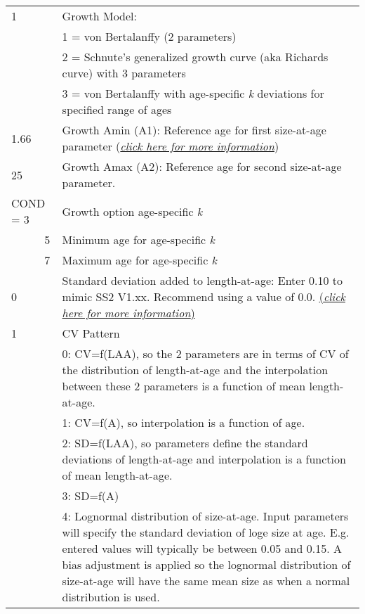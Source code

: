 \begin{center}
\begin{longtable}{p{0.5cm} p{2cm} p{12cm}}
	   \pagebreak

	   1 & & Growth Model: \\
	     & & 1 = von Bertalanffy (2 parameters)\\
	     & & 2 = Schnute's generalized growth curve (aka Richards curve) with 3 parameters \\
	     & & 3 = von Bertalanffy with age-specific \textit{k} deviations for specified range of ages\\
	   \hline

	   1.66 & & Growth Amin (A1): Reference age for first size-at-age parameter (\hyperlink{A1}{\textit{click here for more information}})\\
	   \hline

	   25 & & Growth Amax (A2): Reference age for second size-at-age parameter.\\
	   \hline

	   \multicolumn{2}{l}{COND = 3} & Growth option age-specific \textit{k}\\
	   & 5 & Minimum age for age-specific \textit{k}\\
	   & 7 & Maximum age for age-specific \textit{k}\\
	   \hline

	   0 & & Standard deviation added to length-at-age: Enter 0.10 to mimic SS2 V1.xx. Recommend using a value of 0.0.  \hyperlink{A1}{(\textit{click here for more information})}\\
	   \hline
	   1 & & CV Pattern \\
	     & & 0: CV=f(LAA), so the 2 parameters are in terms of CV of the distribution of length-at-age and the interpolation between these 2 parameters is a function of mean length-at-age.\\
	     & & 1: CV=f(A), so interpolation is a function of age.\\
	     & & 2: SD=f(LAA), so parameters define the standard deviations of length-at-age and interpolation is a function of mean length-at-age.\\
	     & & 3: SD=f(A) \\
	     & & 4: Lognormal distribution of size-at-age.  Input parameters will specify the standard deviation of loge size at age.  E.g. entered values will typically be between 0.05 and 0.15.  A bias adjustment is applied so the lognormal distribution of size-at-age will have the same mean size as when a normal distribution is used.\\
	   \hline


\end{longtable}
\end{center}

